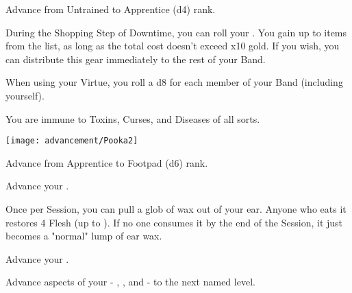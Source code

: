 \begin{multicols*}{2}



Advance  from Untrained to Apprentice (d4) rank.



During the Shopping Step of Downtime, you can roll your \LUCK. You gain up to \SUM items from the  list, as long as the total cost doesn't exceed \SUM x10 gold.  If you wish, you can distribute this gear immediately to the rest of your Band.


When using your  Virtue, you roll a d8 for each member of your Band (including yourself).

\cbreak



You are immune to Toxins, Curses, and Diseases of all sorts.


\begin{center}
\texttt{[image: advancement/Pooka2]}
\end{center}

\newpage


Advance  from Apprentice to Footpad (d6) rank.



Advance your  \DCUP.


Once per Session, you can pull a glob of wax out of your ear.  Anyone who eats it restores 4 Flesh (up to \MAX). If no one consumes it by the end of the Session, it just becomes a "normal" lump of ear wax.


Advance your  \DCUP.


Advance  aspects of your  - \DEATH, \INJURY, and \INSANITY - to the next named level.


\end{multicols*}
